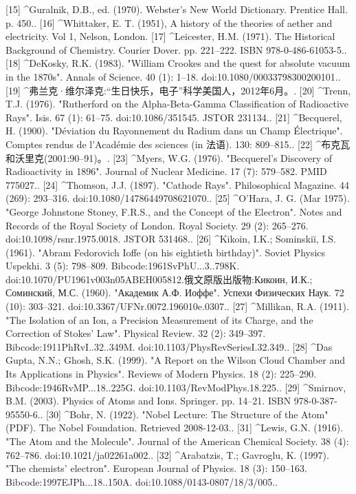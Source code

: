 [15]
^Guralnik, D.B., ed. (1970). Webster's New World Dictionary. Prentice Hall. p. 450..
[16]
^Whittaker, E. T. (1951), A history of the theories of aether and electricity. Vol 1, Nelson, London.
[17]
^Leicester, H.M. (1971). The Historical Background of Chemistry. Courier Dover. pp. 221–222. ISBN 978-0-486-61053-5..
[18]
^DeKosky, R.K. (1983). "William Crookes and the quest for absolute vacuum in the 1870s". Annals of Science. 40 (1): 1–18. doi:10.1080/00033798300200101..
[19]
^弗兰克·维尔泽克:“生日快乐，电子”科学美国人，2012年6月。.
[20]
^Trenn, T.J. (1976). "Rutherford on the Alpha-Beta-Gamma Classification of Radioactive Rays". Isis. 67 (1): 61–75. doi:10.1086/351545. JSTOR 231134..
[21]
^Becquerel, H. (1900). "Déviation du Rayonnement du Radium dans un Champ Électrique". Comptes rendus de l'Académie des sciences (in 法语). 130: 809–815..
[22]
^布克瓦和沃里克(2001:90–91)。.
[23]
^Myers, W.G. (1976). "Becquerel's Discovery of Radioactivity in 1896". Journal of Nuclear Medicine. 17 (7): 579–582. PMID 775027..
[24]
^Thomson, J.J. (1897). "Cathode Rays". Philosophical Magazine. 44 (269): 293–316. doi:10.1080/14786449708621070..
[25]
^O'Hara, J. G. (Mar 1975). "George Johnstone Stoney, F.R.S., and the Concept of the Electron". Notes and Records of the Royal Society of London. Royal Society. 29 (2): 265–276. doi:10.1098/rsnr.1975.0018. JSTOR 531468..
[26]
^Kikoin, I.K.; Sominskiĭ, I.S. (1961). "Abram Fedorovich Ioffe (on his eightieth birthday)". Soviet Physics Uspekhi. 3 (5): 798–809. Bibcode:1961SvPhU...3..798K. doi:10.1070/PU1961v003n05ABEH005812.俄文原版出版物:Кикоин, И.К.; Соминский, М.С. (1960). "Академик А.Ф. Иоффе". Успехи Физических Наук. 72 (10): 303–321. doi:10.3367/UFNr.0072.196010e.0307..
[27]
^Millikan, R.A. (1911). "The Isolation of an Ion, a Precision Measurement of its Charge, and the Correction of Stokes' Law". Physical Review. 32 (2): 349–397. Bibcode:1911PhRvI..32..349M. doi:10.1103/PhysRevSeriesI.32.349..
[28]
^Das Gupta, N.N.; Ghosh, S.K. (1999). "A Report on the Wilson Cloud Chamber and Its Applications in Physics". Reviews of Modern Physics. 18 (2): 225–290. Bibcode:1946RvMP...18..225G. doi:10.1103/RevModPhys.18.225..
[29]
^Smirnov, B.M. (2003). Physics of Atoms and Ions. Springer. pp. 14–21. ISBN 978-0-387-95550-6..
[30]
^Bohr, N. (1922). "Nobel Lecture: The Structure of the Atom" (PDF). The Nobel Foundation. Retrieved 2008-12-03..
[31]
^Lewis, G.N. (1916). "The Atom and the Molecule". Journal of the American Chemical Society. 38 (4): 762–786. doi:10.1021/ja02261a002..
[32]
^Arabatzis, T.; Gavroglu, K. (1997). "The chemists' electron". European Journal of Physics. 18 (3): 150–163. Bibcode:1997EJPh...18..150A. doi:10.1088/0143-0807/18/3/005..
